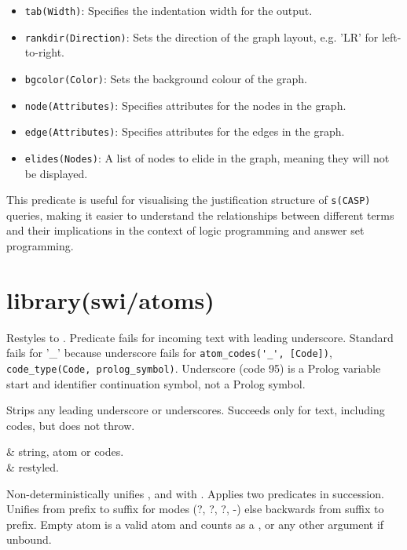 \begin{description}
\begin{itemize}
    \item \verb$tab(Width)$: Specifies the indentation width for the output.
    \item \verb$rankdir(Direction)$: Sets the direction of the graph layout, e.g.
'LR' for left-to-right.
    \item \verb$bgcolor(Color)$: Sets the background colour of the graph.
    \item \verb$node(Attributes)$: Specifies attributes for the nodes in the graph.
    \item \verb$edge(Attributes)$: Specifies attributes for the edges in the graph.
    \item \verb$elides(Nodes)$: A list of nodes to elide in the graph, meaning they
will not be displayed.
\end{itemize}

This predicate is useful for visualising the justification structure of
\verb$s(CASP)$ queries, making it easier to understand the relationships
between different terms and their implications in the context of logic
programming and answer set programming.
\end{description}

\chapter{library(swi/atoms)}\label{sec:atoms}

\begin{description}
Restyles  to . Predicate  fails for
incoming text with leading underscore. Standard
 fails for '_' because underscore fails for
\verb$atom_codes('_', [Code])$, \verb$code_type(Code, prolog_symbol)$. Underscore
(code 95) is a Prolog variable start and identifier continuation
symbol, not a Prolog symbol.

Strips any leading underscore or underscores. Succeeds only for
text, including codes, but does not throw.

\begin{arguments}
 & string, atom or codes. \\
 & restyled. \\
\end{arguments}

Non-deterministically unifies ,  and  with .
Applies two  predicates in succession. Unifies from
prefix to suffix for modes (?, ?, ?, -) else backwards from suffix
to prefix. Empty atom is a valid atom and counts as a , 
or any other argument if unbound.
\end{description}

